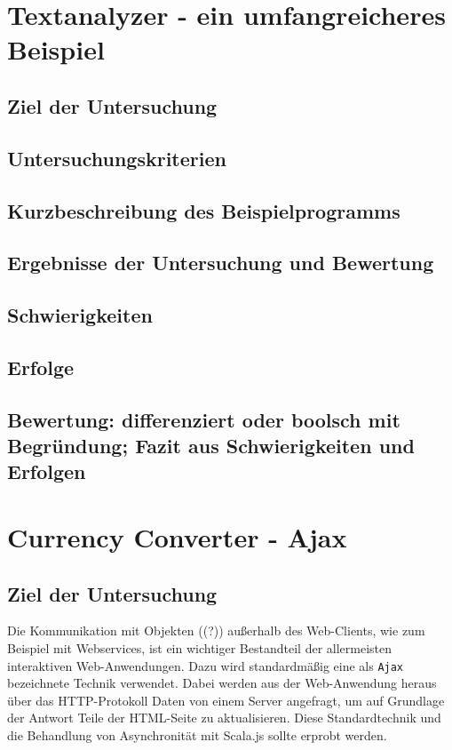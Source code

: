 \documentclass[a4paper, 12pt, hidelinks, listof=totoc, listoftables=totoc, bibliography=totoc]{scrreprt}
\begin{document}
\section{Textanalyzer - ein umfangreicheres Beispiel}


\subsection{Ziel der Untersuchung}
\subsection{Untersuchungskriterien}
\subsection{Kurzbeschreibung des Beispielprogramms}
\subsection{Ergebnisse der Untersuchung und Bewertung}
\subsection{Schwierigkeiten}
\subsection{Erfolge}
\subsection{Bewertung: differenziert oder boolsch mit Begründung; Fazit aus Schwierigkeiten und Erfolgen}



\section{Currency Converter - Ajax}


\subsection{Ziel der Untersuchung}

Die Kommunikation mit Objekten ((?)) außerhalb des Web-Clients, wie zum Beispiel mit Webservices, ist ein wichtiger Bestandteil der allermeisten interaktiven Web-Anwendungen. Dazu wird standardmäßig eine als \texttt{Ajax} bezeichnete Technik verwendet. Dabei werden aus der Web-Anwendung heraus über das HTTP-Protokoll Daten von einem Server angefragt, um auf Grundlage der Antwort Teile der HTML-Seite zu aktualisieren. Diese Standardtechnik und die Behandlung von Asynchronität mit Scala.js sollte erprobt werden.
\end{document}
